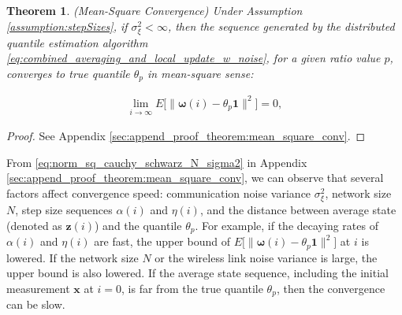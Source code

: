 \documentclass[journal]{IEEEtran}
\newtheorem{theorem}{Theorem}
\begin{document}

\begin{theorem}
	(Mean-Square Convergence) Under Assumption \ref{assumption:stepSizes}, if $\sigma_\xi^2 < \infty$, then the sequence generated by the distributed quantile estimation algorithm \eqref{eq:combined_averaging_and_local_update_w_noise}, for a given ratio value $p$, converges to true quantile $\theta_p$ in mean-square sense:
	
	\vspace{-4mm}
	\small
	\begin{align}
	\lim_{i\to\infty} E\Big[\big\| \bm{\omega}(i) - \theta_p \mathbf{1}\big\|^2\Big] = 0, \label{eq:theorem2}
	\end{align}
	\normalsize  
	\label{theorem:mean-square-convergence}
\end{theorem}
\begin{proof} \vspace{-5mm}
	See Appendix \ref{sec:append_proof_theorem:mean_square_conv}. 	
\end{proof}

\vspace{-1mm}
{}{
From \eqref{eq:norm_sq_cauchy_schwarz_N_sigma2} in Appendix \ref{sec:append_proof_theorem:mean_square_conv}, we can observe that several factors affect convergence speed: communication noise variance $\sigma_\xi^2$, network size $N$, step size sequences $\alpha(i)$ and $\eta(i)$, and the distance between average state (denoted as $\mathbf{z}(i)$) and the quantile $\theta_p$. For example, if the decaying rates of $\alpha(i)$ and $\eta(i)$ are fast, the upper bound of $E\big[\| \bm{\omega}(i) - \theta_p \mathbf{1}\|^2\big]$ at $i$ is lowered. If the network size $N$ or the wireless link noise variance is large, the upper bound is also lowered. If the average state sequence, including the initial measurement $\mathbf{x}$ at $i=0$, is far from the true quantile $\theta_p$, then the convergence can be slow.}
\end{document}

